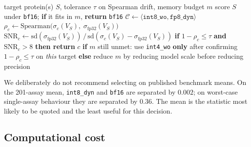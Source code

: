 \documentclass[11pt]{article}
\newcommand{\cfg}[1]{\texttt{#1}}
\begin{document}
\begin{algorithm}[htb]
\caption{Choosing a precision configuration for a variant-effect workload. The
screen requires no ground-truth labels, because Section~\ref{sec:fidelity}
establishes that drift from fp32 bounds how far the answer can move even though
it does not indicate direction. The SNR test added at the third line is what
converts that bound into a decision: drift alone is uncalibrated, since the same
absolute movement is harmless on an assay with a wide score distribution and
fatal on a narrow one (Section~\ref{sec:snr}).}
\label{alg:select}
\begin{algorithmic}[1]
\Require target protein(s) $S$, tolerance $\tau$ on Spearman drift, memory budget $m$
\State score $S$ under \cfg{bf16}; \textbf{if} it fits in $m$, \textbf{return} \cfg{bf16}
\State $\mathcal{C} \gets \langle \cfg{int8\_wo}, \cfg{fp8\_dyn} \rangle$
  \State $\rho_c \gets \mathrm{Spearman}\big(\sigma_c(V_S),\; \sigma_{\text{fp32}}(V_S)\big)$
         \label{ln:screen}
  \State $\mathrm{SNR}_c \gets \mathrm{sd}(\sigma_{\text{fp32}}(V_S)) \,/\,
         \mathrm{sd}(\sigma_c(V_S) - \sigma_{\text{fp32}}(V_S))$
  \State \textbf{if} $1 - \rho_c \leq \tau$ \textbf{and} $\mathrm{SNR}_c > 8$
         \textbf{then return} $c$
\EndFor
\State \textbf{if} $m$ still unmet: use \cfg{int4\_wo} \textbf{only} after
       confirming $1-\rho_c \le \tau$ on \emph{this} target
\State \textbf{else} reduce $m$ by reducing model scale before reducing precision
\end{algorithmic}
\end{algorithm}

We deliberately do not recommend selecting on published benchmark means. On the
201-assay mean, \cfg{int8\_dyn} and \cfg{bf16} are separated by $0.002$; on
worst-case single-assay behaviour they are separated by $0.36$. The mean is the
statistic most likely to be quoted and the least useful for this decision.

\subsection{Computational cost}
\end{document}
